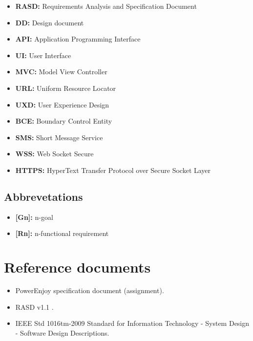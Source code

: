 \begin{itemize}
\item \textbf{RASD:} Requirements Analysis and Specification Document
\item \textbf{DD: } Design document
\item \textbf{API:} Application Programming Interface
\item \textbf{UI:} User Interface
\item \textbf{MVC: } Model View Controller
\item \textbf{URL: } Uniform Resource Locator
\item \textbf{UXD: } User Experience Design
\item \textbf{BCE: } Boundary Control Entity
\item \textbf{SMS: } Short Message Service
\item \textbf{WSS: } Web Socket Secure
\item \textbf{HTTPS: } HyperText Transfer Protocol over Secure Socket Layer

\end{itemize}

\subsection{Abbrevetations}

\begin{itemize}
\item \textbf{{[Gn]}:} n-goal
\item \textbf{{[Rn]}:} n-functional requirement
\end{itemize}

\section{Reference documents}

\begin{itemize}
\item PowerEnjoy specification document (assignment).
\item RASD v1.1 .
\item IEEE Std 1016tm-2009 Standard for Information Technology - System Design - Software Design Descriptions.
\end{itemize}

